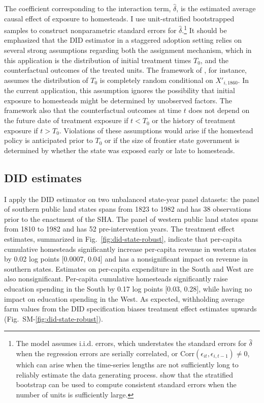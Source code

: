 \documentclass[12pt]{article}
\begin{document}
The coefficient corresponding to the interaction term, $\hat{\delta}$, is the estimated average causal effect of exposure to homesteads. I use unit-stratified bootstrapped samples to construct nonparametric standard errors for $\hat{\delta}$.\footnote{The model assumes i.i.d. errors, which understates the standard errors for $\hat{\delta}$ when the regression errors are serially correlated, or $\mathrm{Corr} (\epsilon_{it}, \epsilon_{i,t-1}) \neq 0$, which can arise when the time-series lengths are not sufficiently long to reliably estimate the data generating process. \citet{bertrand2004much} show that the stratified bootstrap can be used to compute consistent standard errors when the number of units is sufficiently large.} It should be emphasized that the DID estimator in a staggered adoption setting relies on several strong assumptions regarding both the assignment mechanism, which in this application is the distribution of initial treatment times $T_0$, and the counterfactual outcomes of the treated units. The framework of \citet{athey2018design}, for instance, assumes the distribution of $T_0$ is completely random conditional on $X'_{i,1860}$. In the current application, this assumption ignores the possibility that initial exposure to homesteads might be determined by unobserved factors. The framework also that the counterfactual outcomes at time $t$ does not depend on the future date of treatment exposure if $t < T_0$ or the history of treatment exposure if $t > T_0$. Violations of these assumptions would arise if the homestead policy is anticipated prior to $T_0$ or if the size of frontier state government is determined by whether the state was exposed early or late to homesteads. 

\subsection{DID estimates}
I apply the DID estimator on two unbalanced state-year panel datasets: the panel of southern public land states spans  from 1823 to 1982 and has 38 observations prior to the enactment of the SHA. The panel of western public land states spans from 1810 to 1982 and has 52 pre-intervention years. The treatment effect estimates, summarized in Fig.~\ref{fig:did-state-robust}, indicate that per-capita cumulative homesteads significantly increase per-capita revenue in western states by 0.02 log points [0.0007, 0.04] and has a nonsignificant impact on revenue in southern states. Estimates on per-capita expenditure in the South and West are also nonsignificant. Per-capita cumulative homesteads significantly raise education spending in the South by 0.17 log points [0.03, 0.28], while having no impact on education spending in the West. As expected, withholding average farm values from the DID specification biases treatment effect estimates upwards (Fig.~SM-\ref{fig:did-state-robust}).
\end{document}
